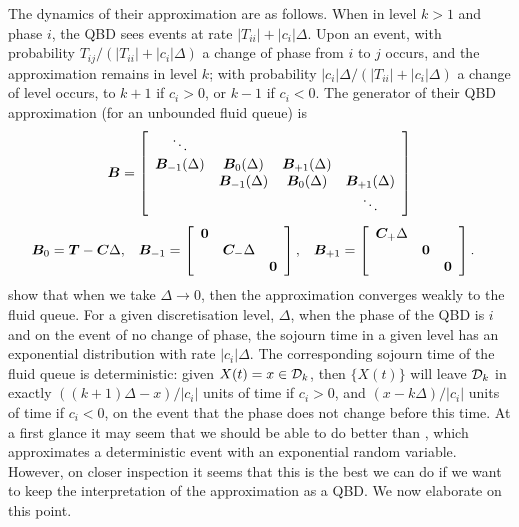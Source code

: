 The dynamics of their approximation are as follows. When in level \(k>1\) and phase \(i\), the QBD sees events at rate \(|T_{ii}| + |c_i|\Delta\). Upon an event, with probability \(T_{ij}/(|T_{ii}| + |c_i|\Delta)\) a change of phase from \(i\) to \(j\) occurs, and the approximation remains in level \(k\); with probability \(|c_i|\Delta/(|T_{ii}| + |c_i|\Delta)\) a change of level occurs, to \(k+1\) if \(c_i>0\), or \(k-1\) if \(c_i<0\). The generator of their QBD approximation (for an unbounded fluid queue) is 
\[\boldsymbol B = \left[ \begin{array}{cccc} \ddots &  &  & \\ \boldsymbol B_{-1}(\Delta) & \boldsymbol B_0(\Delta) & \boldsymbol B_{+1}(\Delta) & \\  & \boldsymbol B_{-1}(\Delta) & \boldsymbol B_0(\Delta) & \boldsymbol B_{+1}(\Delta) \\ &  &  & \ddots \end{array} \right]\]
\begin{align}
\boldsymbol B_0 &= \boldsymbol T- \boldsymbol C\Delta, && \boldsymbol B_{-1} = \left[\begin{array}{ccc} \boldsymbol 0 & & \\ & \boldsymbol C_-\Delta & \\ & & \boldsymbol 0 \end{array}\right], && \boldsymbol B_{+1} = \left[\begin{array}{ccc} \boldsymbol C_+\Delta & & \\ & \boldsymbol 0 & \\ & & \boldsymbol 0\end{array}\right].
\end{align}
\cite{bo2013} show that when we take \(\Delta \to 0\), then the approximation converges weakly to the fluid queue. For a given discretisation level, \(\Delta\), when the phase of the QBD is \(i\) and on the event of no change of phase, the sojourn time in a given level has an exponential distribution with rate \(|c_i|\Delta\). The corresponding sojourn time of the fluid queue is deterministic: given \(X(t) = x \in\mathcal{D}_k\), then \(\{X(t)\}\) will leave \(\mathcal{D}_k\) in exactly \(((k+1)\Delta - x)/|c_i|\) units of time if \(c_i>0\), and \((x-k\Delta)/|c_i|\) units of time if \(c_i<0\), on the event that the phase does not change before this time. At a first glance it may seem that we should be able to do better than \cite{bo2013}, which approximates a deterministic event with an exponential random variable. However, on closer inspection it seems that this is the best we can do if we want to keep the interpretation of the approximation as a QBD. We now elaborate on this point.


